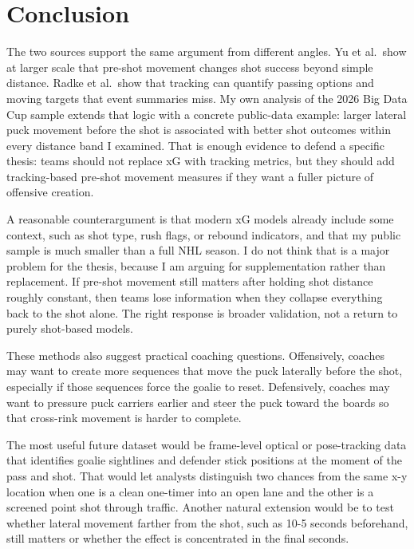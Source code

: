 \documentclass[
  10pt,
]{extarticle}
\begin{document}
\section{Conclusion}\label{conclusion}

The two sources support the same argument from different angles. Yu et al.~show at larger scale that pre-shot movement changes shot success beyond simple distance. Radke et al.~show that tracking can quantify passing options and moving targets that event summaries miss. My own analysis of the 2026 Big Data Cup sample extends that logic with a concrete public-data example: larger lateral puck movement before the shot is associated with better shot outcomes within every distance band I examined. That is enough evidence to defend a specific thesis: teams should not replace xG with tracking metrics, but they should add tracking-based pre-shot movement measures if they want a fuller picture of offensive creation.

A reasonable counterargument is that modern xG models already include some context, such as shot type, rush flags, or rebound indicators, and that my public sample is much smaller than a full NHL season. I do not think that is a major problem for the thesis, because I am arguing for supplementation rather than replacement. If pre-shot movement still matters after holding shot distance roughly constant, then teams lose information when they collapse everything back to the shot alone. The right response is broader validation, not a return to purely shot-based models.

These methods also suggest practical coaching questions. Offensively, coaches may want to create more sequences that move the puck laterally before the shot, especially if those sequences force the goalie to reset. Defensively, coaches may want to pressure puck carriers earlier and steer the puck toward the boards so that cross-rink movement is harder to complete.

The most useful future dataset would be frame-level optical or pose-tracking data that identifies goalie sightlines and defender stick positions at the moment of the pass and shot. That would let analysts distinguish two chances from the same x-y location when one is a clean one-timer into an open lane and the other is a screened point shot through traffic. Another natural extension would be to test whether lateral movement farther from the shot, such as 10-5 seconds beforehand, still matters or whether the effect is concentrated in the final seconds.
\end{document}
